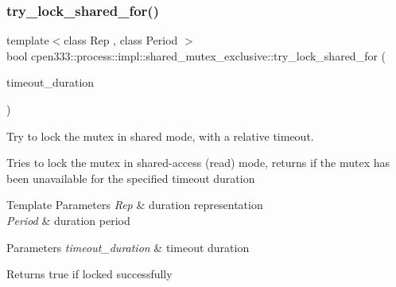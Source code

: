 \subsubsection{\texorpdfstring{try\+\_\+lock\+\_\+shared\+\_\+for()}{try\_lock\_shared\_for()}}
{\footnotesize\ttfamily template$<$class Rep , class Period $>$ \\
bool cpen333\+::process\+::impl\+::shared\+\_\+mutex\+\_\+exclusive\+::try\+\_\+lock\+\_\+shared\+\_\+for (\begin{DoxyParamCaption}\item[{const std\+::chrono\+::duration$<$ Rep, Period $>$ \&}]{timeout\+\_\+duration }\end{DoxyParamCaption})\hspace{0.3cm}{\ttfamily [inline]}}



Try to lock the mutex in shared mode, with a relative timeout. 

Tries to lock the mutex in shared-\/access (read) mode, returns if the mutex has been unavailable for the specified timeout duration


\begin{DoxyTemplParams}{Template Parameters}
{\em Rep} & duration representation \\
\hline
{\em Period} & duration period \\
\hline
\end{DoxyTemplParams}

\begin{DoxyParams}{Parameters}
{\em timeout\+\_\+duration} & timeout duration \\
\hline
\end{DoxyParams}
\begin{DoxyReturn}{Returns}
true if locked successfully 
\end{DoxyReturn}
\mbox{\label{classcpen333_1_1process_1_1impl_1_1shared__mutex__exclusive_aaf84cb604f6486ab2c627f236753cb7c}} 
